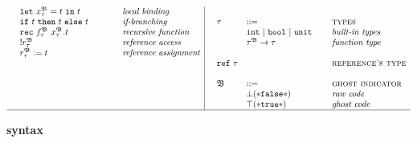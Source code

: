 \begin{figure}[H]
\begin{adjustwidth}{-3em}{-3em}
\begin{displaymath}
\begin{array}{ll@{\hspace*{-0.1cm}}
							 l@{\hspace*{1.5cm} }
							 l|@{\hspace*{0.5cm}}
							 llll}
  & \mathtt{let} ~ \gvar{x}{}{} = t~ \mathtt{in}~ t    
  & & \textit{local binding} 
  & & & & \\		
   								   
  & \mathtt{if}~t~\mathtt{then}~t~\mathtt{else}~t
  & & \textit{if-branching}    
  &  \tau & ::= 
  & & \textsc{types} \\ 
   		 								      								   
  &	\mathtt{rec} ~ \gvar{f}{}{} ~ \gvar{x}{}{}. t    
  & &  \textit{recursive function} &
  &  \mathtt{int}~ | ~\mathtt{bool}~ | ~\mathtt{unit}~  
  & & \textit{built-in types} \\ 
   	   		
   	   								      								   
  &  	\mathtt{!}\gvar{r}{}{} 
  & &  \textit{reference access} &
  &     \tau^{\mathfrak{B}}  \rightarrow \tau  
  & & \textit{function type} \\    					
 	   
	&  	\gvar{r}{}{} := t  
	& &  \textit{reference assignment} & \\
	
	& & & &		\mathtt{ref}~\tau  &
	& & \textsc{reference's type}  \\   
  
  & & & & \\  
   	
  & & & & \mathfrak{B} & ::= 
  & & \textsc{ghost indicator} \\
         
  & & & & &  \bot \mathtt{(* false *)} 
  & & \textit{raw code} \\ 
    
  & & & & &  \top \mathtt{(* true *)} 
  & & \textit{ghost code} \\ 
 
 \hline						   
  \end{array} 
\end{displaymath} 
\caption{ \textbf{\gml syntax} \hfill}
\end{adjustwidth}
\end{figure}
%
%
%

